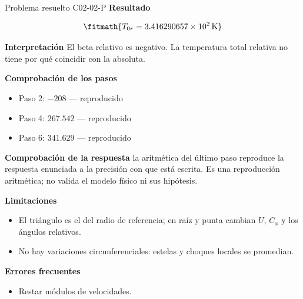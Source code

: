 \documentclass[10pt,openany]{book}
\begin{document}
\begin{studiumworked}{Problema resuelto C02-02-P}
\noindent\textbf{Resultado}

\[
\fitmath{T_{0r}=3.416290657\times10^{2}\,\mathrm{K}}
\]

\noindent\textbf{Interpretación}
El beta relativo es negativo. La temperatura total relativa no tiene por qué coincidir con la absoluta.

\noindent\textbf{Comprobación de los pasos}
\begin{itemize}
\item Paso 2: $-208$ — reproducido
\item Paso 4: $267.542$ — reproducido
\item Paso 6: $341.629$ — reproducido
\end{itemize}

\noindent\textbf{Comprobación de la respuesta} la aritmética del último paso reproduce la respuesta enunciada a la precisión con que está escrita. Es una reproducción aritmética; no valida el modelo físico ni sus hipótesis.

\noindent\textbf{Limitaciones}
\begin{itemize}
\item El triángulo es el del radio de referencia; en raíz y punta cambian $U$, $C_x$ y los ángulos relativos.
\item No hay variaciones circunferenciales: estelas y choques locales se promedian.
\end{itemize}

\noindent\textbf{Errores frecuentes}
\begin{itemize}
\item Restar módulos de velocidades.
\end{itemize}
\end{studiumworked}
\end{document}
